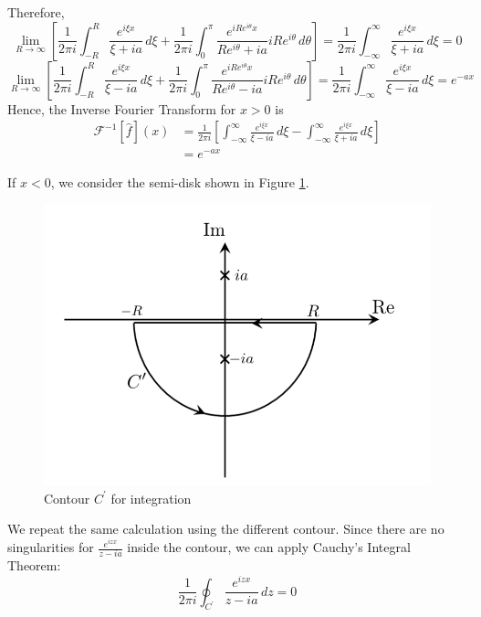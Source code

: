 \documentclass[letterpaper, 12pt]{article}
\theoremstyle{custom}
\begin{document}
Therefore,
\begin{equation*}
  \lim_{R \rightarrow \infty}\left[ \frac{1}{2 \pi i} \int_{-R}^{R} \frac{e^{i\xi x}}{\xi+ia} \, d\xi  + \frac{1}{2 \pi i} \int_{0}^{\pi} \frac{e^{i Re^{i \theta} x}}{Re^{i \theta}+ia} iRe^{i \theta} \, d \theta\right]
  = \frac{1}{2 \pi i} \int_{-\infty}^{\infty} \frac{e^{i\xi x}}{\xi+ia} \, d\xi = 0
\end{equation*}
\begin{equation*}
  \lim_{R \rightarrow \infty}\left[ \frac{1}{2 \pi i} \int_{-R}^{R} \frac{e^{i\xi x}}{\xi-ia} \, d\xi  + \frac{1}{2 \pi i} \int_{0}^{\pi} \frac{e^{i Re^{i \theta} x}}{Re^{i \theta}-ia} iRe^{i \theta} \, d \theta\right]
  = \frac{1}{2 \pi i} \int_{-\infty}^{\infty} \frac{e^{i\xi x}}{\xi-ia} \, d\xi = e^{-a x}
\end{equation*}
Hence, the Inverse Fourier Transform for $x>0$ is
\begin{align*}
  \mathcal{F}^{-1}  \left[ \hat{f} \right] \left( x \right) 
  &= \frac{1}{2 \pi i} \left[ \int_{-\infty}^{\infty} \frac{e^{i\xi x}}{\xi-ia} \, d\xi -  \int_{-\infty}^{\infty} \frac{e^{i\xi x}}{\xi+ia} \, d\xi \right] \\
  &= e^{-a x}
\end{align*}


If $x<0$, we consider the semi-disk shown in Figure \ref{fig2}.
\begin{figure}[htbp]
  \centering
  \includegraphics[width=.7\columnwidth]{Contour2.png}
  \caption{Contour $C^\prime$ for integration}
  \label{fig2}
\end{figure}




We repeat the same calculation using the different contour.
Since there are no singularities for $\displaystyle \frac{e^{izx}}{z-ia}$ inside the contour, we can apply Cauchy's Integral Theorem:
\begin{equation*}
  \frac{1}{2 \pi i} \oint_{C^\prime} \frac{e^{i z x}}{z-ia} \, dz = 0
\end{equation*}
\end{document}
